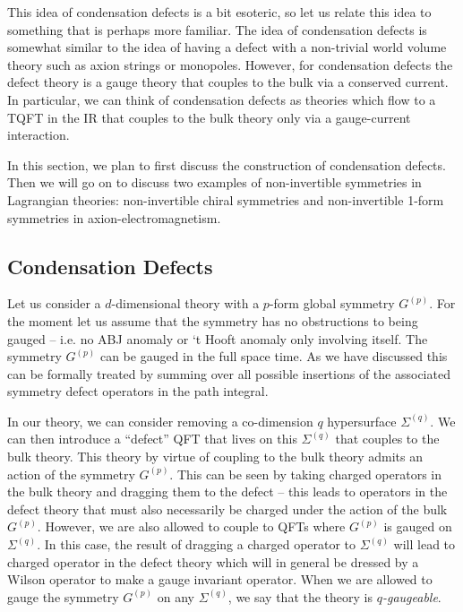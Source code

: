 \documentclass[11pt]{article}
\begin{document}
This idea of condensation defects is a bit esoteric, so let us relate this idea to something that is perhaps more familiar. The idea of condensation defects is somewhat similar to the  idea of having a defect with a non-trivial world volume theory such as axion strings or monopoles. However, for condensation defects the defect theory is a gauge theory that couples to the bulk via a conserved current. In particular, we can think of condensation defects as theories which flow to a TQFT in the IR that couples  to the bulk theory only via a gauge-current interaction. 



In this section, we plan to first discuss the construction of condensation defects. Then we will go on to discuss two examples of non-invertible symmetries in Lagrangian theories: non-invertible chiral symmetries and non-invertible 1-form symmetries in axion-electromagnetism. 


\subsection{Condensation Defects}



Let us consider a $d$-dimensional theory with a $p$-form global symmetry $G^{(p)}$. For the moment let us assume that the symmetry has no obstructions to being gauged -- i.e. no ABJ anomaly or `t Hooft anomaly only involving itself. The symmetry $G^{(p)}$ can be gauged in the full space time. As we have discussed this can be formally treated by summing over all possible insertions of the associated symmetry defect operators in the path integral. 

In our theory, we can consider removing a co-dimension $q$ hypersurface $\Sigma^{(q)}$. We can then introduce a ``defect'' QFT that lives on this $\Sigma^{(q)}$ that couples to the bulk theory. This theory by virtue of coupling to the bulk theory admits an action of the symmetry $G^{(p)}$. This can be seen by taking charged operators in the bulk theory and dragging them to the defect -- this leads to operators in the defect theory that must also necessarily be charged under the action of the bulk $G^{(p)}$. However, we are also allowed to couple to QFTs where $G^{(p)}$ is gauged on $\Sigma^{(q)}$. In this case, the result of dragging a charged operator to $\Sigma^{(q)}$ will lead to charged operator in the defect theory which will in general be dressed by a Wilson operator to make a gauge invariant operator. 
When we are allowed to gauge the symmetry $G^{(p)}$ on any $\Sigma^{(q)}$, we say that the theory is \emph{$q$-gaugeable}. 
\end{document}
